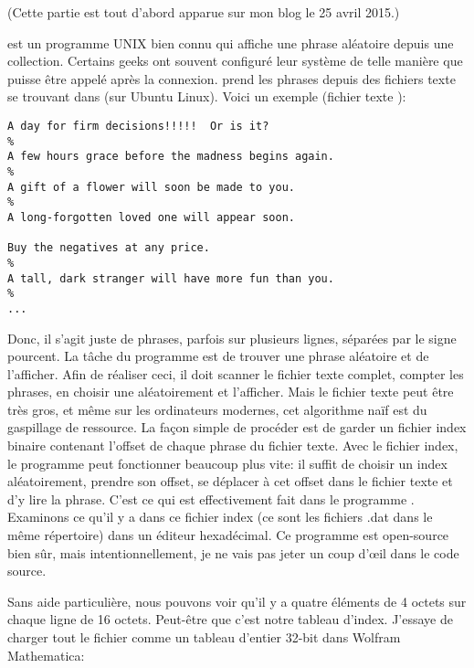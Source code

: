 
(Cette partie est tout d'abord apparue sur mon blog le 25 avril 2015.)

 est un programme UNIX bien connu qui affiche une phrase aléatoire depuis
une collection.
Certains geeks ont souvent configuré leur système de telle manière que 
puisse être appelé après la connexion.
 prend les phrases depuis des fichiers texte se trouvant dans 
(sur Ubuntu Linux).
Voici un exemple (fichier texte ):

\begin{lstlisting}
A day for firm decisions!!!!!  Or is it?
%
A few hours grace before the madness begins again.
%
A gift of a flower will soon be made to you.
%
A long-forgotten loved one will appear soon.

Buy the negatives at any price.
%
A tall, dark stranger will have more fun than you.
%
...
\end{lstlisting}

Donc, il s'agit juste de phrases, parfois sur plusieurs lignes, séparées par le
signe pourcent.
La tâche du programme  est de trouver une phrase aléatoire et de l'afficher.
Afin de réaliser ceci, il doit scanner le fichier texte complet, compter les phrases,
en choisir une aléatoirement et l'afficher.
Mais le fichier texte peut être très gros, et même sur les ordinateurs modernes, cet
algorithme naïf est du gaspillage de ressource.
La façon simple de procéder est de garder un fichier index binaire contenant l'offset
de chaque phrase du fichier texte.
Avec le fichier index, le programme  peut fonctionner beaucoup plus vite:
il suffit de choisir un index aléatoirement, prendre son offset, se déplacer à cet
offset dans le fichier texte et d'y lire la phrase.
C'est ce qui est effectivement fait dans le programme .
Examinons ce qu'il y a dans ce fichier index (ce sont les fichiers .dat dans le même
répertoire) dans un éditeur hexadécimal.
Ce programme est open-source bien sûr, mais intentionnellement, je ne vais pas jeter
un coup d'\oe{}il dans le code source.



Sans aide particulière, nous pouvons voir qu'il y a quatre éléments de 4 octets sur
chaque ligne de 16 octets.
Peut-être que c'est notre tableau d'index.
J'essaye de charger tout le fichier comme un tableau d'entier 32-bit dans Wolfram
Mathematica:

